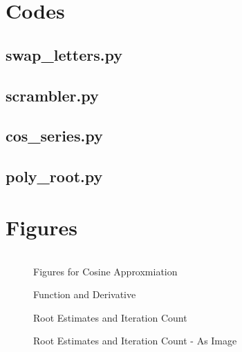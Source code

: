 \documentclass{article}
\begin{document}
\section{Codes}


\lstset{style=python103, language=python} 

\subsection{swap\_letters.py}
\clearpage

\subsection{scrambler.py}
\clearpage

\subsection{cos\_series.py}
\clearpage

\subsection{poly\_root.py}
\clearpage 


\section{Figures}
\begin{figure}[ht!]
\begin{center}
\begin{tabular}{cc}
\end{tabular}
\caption{Figures for Cosine Approxmiation}
\end{center}
\end{figure}
\clearpage
\begin{figure}[ht!]
\begin{center}
\caption{Function and Derivative}
\end{center}
\end{figure}
\begin{figure}[ht!]
\begin{center}
\caption{Root Estimates and Iteration Count}
\end{center}
\end{figure}
\begin{figure}[ht!]
\begin{center}
\caption{Root Estimates and Iteration Count - As Image}
\end{center}
\end{figure}
\end{document}

